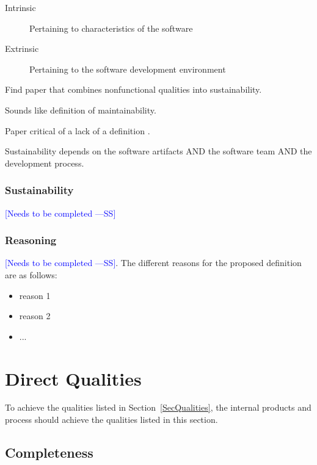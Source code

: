 \documentclass[letterpaper, cleveref]{lipics-v2019}
\newcommand{\authornote}[3]{\textcolor{#1}{[#3 ---#2]}}
\newcommand{\authornote}[3]{}
\newcommand{\wss}[1]{\authornote{blue}{SS}{#1}} %
\newcommand{\ad}[1]{\authornote{cyan}{AD}{#1}} %
\theoremstyle{definition}
\begin{document}
\begin{description}
\item[Intrinsic] Pertaining to characteristics of the software
\item[Extrinsic] Pertaining to the software development environment
\end{description}

Find paper that combines nonfunctional qualities into sustainability.

Sounds like definition of maintainability.

Paper critical of a lack of a definition \citep{VentersEtAl2014}.

Sustainability depends on the software artifacts AND the software team AND the
development process.

\begin{mybox}
\subsubsection*{Sustainability} 
\wss{Needs to be completed}
\end{mybox}

\subsubsection*{Reasoning}

\wss{Needs to be completed}.   The different reasons for the proposed definition
are as follows:

\begin{itemize}
  \item reason 1
  \item reason 2
  \item ...
\end{itemize}


\section{Direct Qualities} \label{SecDirectQs}

To achieve the  qualities listed in Section~\ref{SecQualities}, the internal
products and process should achieve the qualities listed in this section.


\subsection{Completeness} %
\end{document}
